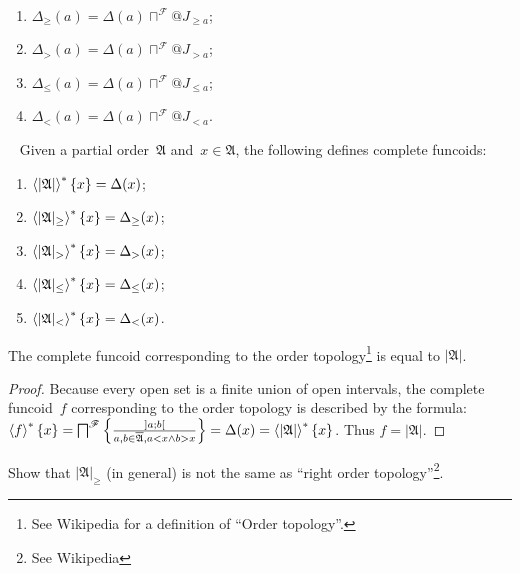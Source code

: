 \begin{obvious}
~
\begin{enumerate}
\item $\Delta_{\geq}(a) = \Delta(a)\sqcap^{\mathscr{F}} @J_{\geq a}$;
\item $\Delta_{>}(a) = \Delta(a)\sqcap^{\mathscr{F}} @J_{>a}$;
\item $\Delta_{\leq}(a) = \Delta(a)\sqcap^{\mathscr{F}} @J_{\leq a}$;
\item $\Delta_{<}(a) = \Delta(a)\sqcap^{\mathscr{F}} @J_{<a}$.
\end{enumerate}
\end{obvious}

\begin{defn}
~
Given a partial order~$\mathfrak{A}$ and~$x\in\mathfrak{A}$, the following defines complete funcoids:
\begin{enumerate}
\item $\left\langle |\mathfrak{A}|\right\rangle ^{\ast}\{x\} = \Delta(x)$;
\item $\left\langle |\mathfrak{A}|_{\geq}\right\rangle ^{\ast}\{x\} = \Delta_{\geq}(x)$;
\item $\left\langle |\mathfrak{A}|_{>}\right\rangle ^{\ast}\{x\} = \Delta_{>}(x)$;
\item $\left\langle |\mathfrak{A}|_{\leq}\right\rangle ^{\ast}\{x\} = \Delta_{\leq}(x)$;
\item $\left\langle |\mathfrak{A}|_{<}\right\rangle ^{\ast}\{x\} = \Delta_{<}(x)$.
\end{enumerate}
\end{defn}

\begin{prop}
The complete funcoid corresponding to the order topology\footnote{See Wikipedia for a definition of ``Order topology''.}
is equal to $|\mathfrak{A}|$.
\end{prop}

\begin{proof}
Because every open set is a finite union of open intervals, the complete funcoid~$f$ corresponding to the order topology
is described by the formula: $\left\langle f\right\rangle ^{\ast}\{x\} = \bigsqcap^{\mathscr{F}}\left\{ \frac{]a;b[}{a,b\in\overline{\mathfrak{A}}, a<x\land b>x}\right\} =
\Delta(x) = \left\langle |\mathfrak{A}|\right\rangle ^{\ast}\{x\}$. Thus $f=|\mathfrak{A}|$.
\end{proof}

\begin{xca}
Show that $|\mathfrak{A}|_{\geq}$ (in general) is not the same as ``right order topology''\footnote{See Wikipedia}.
\end{xca}

